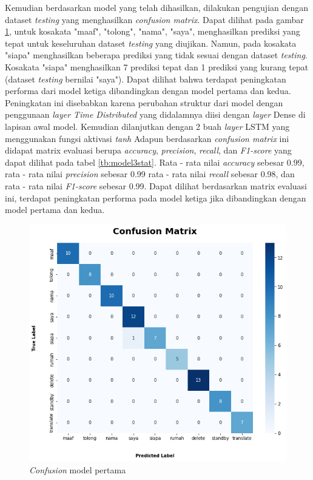 Kemudian berdasarkan model yang telah dihasilkan, dilakukan pengujian dengan dataset \emph{testing} yang menghasilkan \emph{confusion matrix}. Dapat dilihat pada gambar \ref{fig:model3-cf}, untuk kosakata "maaf", "tolong", "nama", "saya",  menghasilkan prediksi yang tepat untuk keseluruhan dataset \emph{testing} yang diujikan. Namun, pada kosakata "siapa" menghasilkan beberapa prediksi yang tidak sesuai dengan dataset \emph{testing}. Kosakata "siapa" menghasilkan 7 prediksi tepat dan 1 prediksi yang kurang tepat (dataset \emph{testing} bernilai "saya"). Dapat dilihat bahwa terdapat peningkatan performa dari model ketiga dibandingkan dengan model pertama dan kedua. Peningkatan ini disebabkan karena perubahan struktur dari model dengan penggunaan \emph{layer Time Distributed} yang didalamnya diisi dengan \emph{layer} Dense di lapisan awal model. Kemudian dilanjutkan dengan 2 buah \emph{layer} LSTM yang menggunakan fungsi aktivasi \emph{tanh} Adapun berdasarkan \emph{confusion matrix} ini didapat matrix evaluasi berupa \emph{accuracy}, \emph{precision}, \emph{recall}, dan \emph{F1-score} yang dapat dilihat pada tabel \ref{tb:model3stat}. Rata - rata nilai \emph{accuracy} sebesar 0.99, rata - rata nilai \emph{precision} sebesar 0.99 rata - rata nilai \emph{recall} sebesar 0.98, dan rata - rata nilai \emph{F1-score} sebesar 0.99. Dapat dilihat berdasarkan matrix evaluasi ini, terdapat peningkatan performa pada model ketiga jika dibandingkan dengan model pertama dan kedua.

\begin{figure}[H]
  \centering

  \includegraphics[scale=0.6]{gambar/bab4-uji-model-best-cf.png}

  \caption{\emph{Confusion} model pertama}
  \label{fig:model3-cf}
\end{figure}

